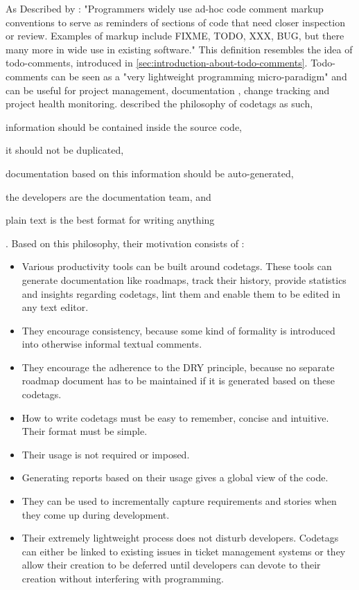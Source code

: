 As Described by \citeauthor{elliott_pep_2005} \cite{elliott_pep_2005}: "Programmers widely use ad-hoc code comment markup conventions to serve as reminders of sections of code that need closer inspection or review. Examples of markup include FIXME, TODO, XXX, BUG, but there many more in wide use in existing software."
This definition resembles the idea of todo-comments, introduced in \ref{sec:introduction-about-todo-comments}.
Todo-comments can be seen as a "very lightweight programming micro-paradigm" \cite{elliott_pep_2005} and can be useful for project management, documentation , change tracking and project health monitoring.
\cite{elliott_pep_2005} described the philosophy of codetags as such,
\begin{enumerate*}[label=(\roman*)]
\item information should be contained inside the source code,
\item it should not be duplicated,
\item documentation based on this information should be auto-generated,
\item the developers are the documentation team, and
\item plain text is the best format for writing anything
\end{enumerate*}.
Based on this philosophy, their motivation consists of \cite{elliott_pep_2005}:
\begin{itemize}
  \item Various productivity tools can be built around codetags. These tools can generate documentation like roadmaps, track their history, provide statistics and insights regarding codetags, lint them and enable them to be edited in any text editor.
  \item They encourage consistency, because some kind of formality is introduced into otherwise informal textual comments.
  \item They encourage the adherence to the DRY principle, because no separate roadmap document has to be maintained if it is generated based on these codetags.
  \item How to write codetags must be easy to remember, concise and intuitive. Their format must be simple.
  \item Their usage is not required or imposed.
  \item Generating reports based on their usage gives a global view of the code.
  \item They can be used to incrementally capture requirements and stories when they come up during development.
  \item Their extremely lightweight process does not disturb developers. Codetags can either be linked to existing issues in ticket management systems or they allow their creation to be deferred until developers can devote to their creation without interfering with programming.
\end{itemize}

